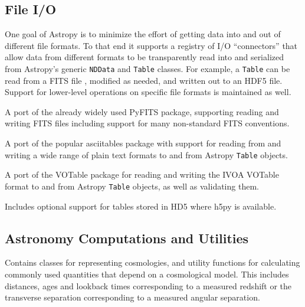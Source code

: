 \documentclass[11pt,twoside]{article}
\begin{document}
\subsection{File I/O}

One goal of Astropy is to minimize the effort of getting data into and out of
different file formats.  To that end it supports a registry of I/O ``connectors''
that allow data from different formats to be transparently read into and
serialized from Astropy's generic \texttt{NDData} and \texttt{Table} classes.
For example, a \texttt{Table} can be read from a FITS file \citep{fits3},
modified as needed, and written out to an HDF5 file.  Support for lower-level
operations on specific file formats is maintained as well.


A port of the already widely used PyFITS \citep{barrett1999pyfits} package,
supporting reading and writing FITS files including support for many
non-standard FITS conventions.


A port of the popular asciitables package with support for reading from and
writing a wide range of plain text formats to and from Astropy \texttt{Table}
objects.


A port of the VOTable package for reading and writing the IVOA VOTable format
\citep{oschenbein2009votable} to and from Astropy \texttt{Table} objects, as
well as validating them.


Includes optional support for tables stored in HD5 where h5py is available.

\subsection{Astronomy Computations and Utilities}


Contains classes for representing cosmologies, and utility functions for
calculating commonly used quantities that depend on a cosmological model.  This
includes distances, ages and lookback times corresponding to a measured
redshift or the transverse separation corresponding to a measured angular
separation.

\end{document}
